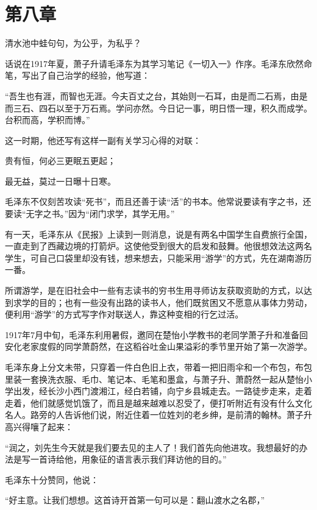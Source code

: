 \documentclass[../../dazhuan.tex]{subfiles}
\begin{document}
\chapter*{第八章}
\begin{pref}
	清水池中蛙句句，为公乎，为私乎？
\end{pref}

话说在1917年夏，萧子升请毛泽东为其学习笔记《一切入一》作序。毛泽东欣然命笔，写出了自己治学的经验，他写道：

“吾生也有涯，而智也无涯。今夫百丈之台，其始则一石耳，由是而二石焉，由是而三石、四石以至于万石焉。学问亦然。今日记一事，明日悟一理，积久而成学。台积而高，学积而博。”

这一时期，他还写有这样一副有关学习心得的对联： 

\begin{couplet}
贵有恒，何必三更眠五更起；

最无益，莫过一日曝十日寒。
\end{couplet}

毛泽东不仅刻苦攻读“死书”，而且还善于读“活”的书本。他常说要读有字之书，还要读“无字之书。”因为“闭门求学，其学无用。”

有一天，毛泽东从《民报》上读到一则消息，说是有两名中国学生自费旅行全国，一直走到了西藏边境的打箭炉。这使他受到很大的启发和鼓舞。他很想效法这两名学生，可自己口袋里却没有钱，想来想去，只能采用“游学”的方式，先在湖南游历一番。

所谓游学，是在旧社会中一些有志读书的穷书生用寻师访友获取资助的方式，以达到求学的目的；也有一些没有出路的读书人，他们既贫困又不愿意从事体力劳动，便利用“游学”的方式写字作对联送人，靠这种变相的行乞过活。

1917年7月中旬，毛泽东利用暑假，邀同在楚怡小学教书的老同学萧子升和准备回安化老家度假的同学萧蔚然，在这稻谷吐金山果溢彩的季节里开始了第一次游学。

毛泽东身上分文未带，只穿着一件白色旧上衣，带着一把旧雨伞和一个布包，布包里装一套换洗衣服、毛巾、笔记本、毛笔和墨盒，与萧子升、萧蔚然一起从楚怡小学出发，经长沙小西门渡湘江，经白若铺，向宁乡县城走去。一路徒步走来，走着走着，他们就感觉饥饿了，而且是越来越难以忍受了，便打听附近有没有什么文化名人。路旁的人告诉他们说，附近住着一位姓刘的老乡绅，是前清的翰林。萧子升高兴得嚷了起来：

“润之，刘先生今天就是我们要去见的主人了！我们首先向他进攻。我想最好的办法是写一首诗给他，用象征的语言表示我们拜访他的目的。”

毛泽东十分赞同，他说：

“好主意。让我们想想。这首诗开首第一句可以是：翻山渡水之名郡，”
\end{document}
